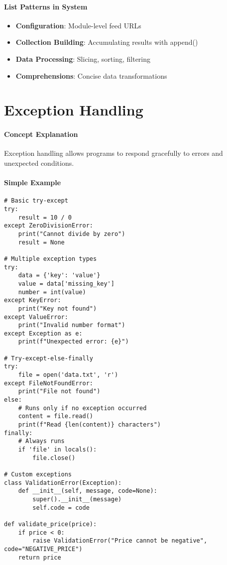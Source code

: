 \paragraph{List Patterns in System}
\begin{itemize}
\item \textbf{Configuration}: Module-level feed URLs
\item \textbf{Collection Building}: Accumulating results with append()
\item \textbf{Data Processing}: Slicing, sorting, filtering
\item \textbf{Comprehensions}: Concise data transformations
\end{itemize}

\section{Exception Handling}

\paragraph{Concept Explanation}
Exception handling allows programs to respond gracefully to errors and unexpected conditions.

\paragraph{Simple Example}
\begin{lstlisting}[caption=Exception Handling Examples]
# Basic try-except
try:
    result = 10 / 0
except ZeroDivisionError:
    print("Cannot divide by zero")
    result = None

# Multiple exception types
try:
    data = {'key': 'value'}
    value = data['missing_key']
    number = int(value)
except KeyError:
    print("Key not found")
except ValueError:
    print("Invalid number format")
except Exception as e:
    print(f"Unexpected error: {e}")

# Try-except-else-finally
try:
    file = open('data.txt', 'r')
except FileNotFoundError:
    print("File not found")
else:
    # Runs only if no exception occurred
    content = file.read()
    print(f"Read {len(content)} characters")
finally:
    # Always runs
    if 'file' in locals():
        file.close()

# Custom exceptions
class ValidationError(Exception):
    def __init__(self, message, code=None):
        super().__init__(message)
        self.code = code

def validate_price(price):
    if price < 0:
        raise ValidationError("Price cannot be negative", code="NEGATIVE_PRICE")
    return price
\end{lstlisting}

